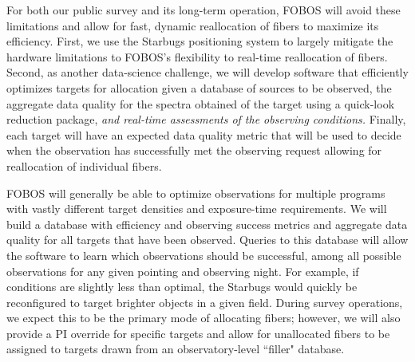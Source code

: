 \documentclass[oneside,11pt]{amsart}
\newcounter{chalno}
\newcommand{\chal}[1]{\refstepcounter{chalno}\label{#1}}
\begin{document}
For both our public survey and its long-term operation, FOBOS will avoid
these limitations and allow for fast, dynamic reallocation of fibers to
maximize its efficiency.  First, we use the Starbugs positioning system
to largely mitigate the hardware limitations to FOBOS's flexibility to
real-time reallocation of fibers.  Second, as another data-science
challenge, we will develop software that efficiently optimizes targets
for allocation given a database of sources to be observed, the aggregate
data quality for the spectra obtained of the target using a quick-look
reduction package, {\it and real-time assessments of the observing
conditions.}  Finally, each target will have an expected data quality
metric that will be used to decide when the observation has successfully
met the observing request allowing for reallocation of individual
fibers.

\medskip \chal{target}   FOBOS will generally be able to optimize observations for
multiple programs with vastly different target densities and
exposure-time requirements.  We will build a database with efficiency
and observing success metrics and aggregate data quality for all targets
that have been observed.  Queries to this database will allow the
software to learn which observations should be successful, among all
possible observations for any given pointing and observing night.  For
example, if conditions are slightly less than optimal, the Starbugs
would quickly be reconfigured to target brighter objects in a given
field.  During survey operations, we expect this to be the primary mode
of allocating fibers; however, we will also provide a PI override for
specific targets and allow for unallocated fibers to be assigned to
targets drawn from an observatory-level ``filler" database.


\end{document}

